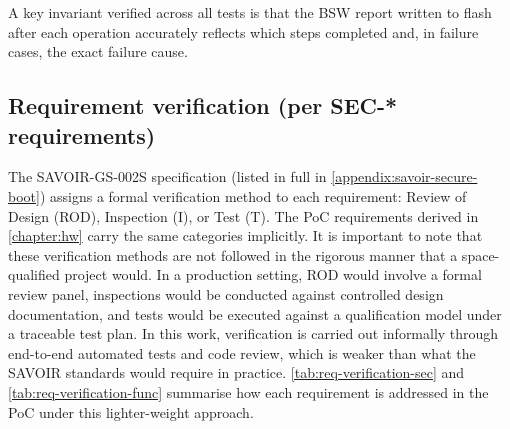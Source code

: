A key invariant verified across all tests is that the BSW report written to flash after each operation accurately reflects which steps completed and, in failure cases, the exact failure cause. 

\subsection{Requirement verification (per SEC-* requirements)}
\label{subsection:eval-securityAnalysis-reqVerification}

The SAVOIR-GS-002S specification (listed in full in \autoref{appendix:savoir-secure-boot}) assigns a formal verification method to each requirement: Review of Design (ROD), Inspection (I), or Test (T). The PoC requirements derived in \autoref{chapter:hw} carry the same categories implicitly. It is important to note that these verification methods are not followed in the rigorous manner that a space-qualified project would. In a production setting, ROD would involve a formal review panel, inspections would be conducted against controlled design documentation, and tests would be executed against a qualification model under a traceable test plan. In this work, verification is carried out informally through end-to-end automated tests and code review, which is weaker than what the SAVOIR standards would require in practice. \autoref{tab:req-verification-sec} and \autoref{tab:req-verification-func} summarise how each requirement is addressed in the PoC under this lighter-weight approach.

